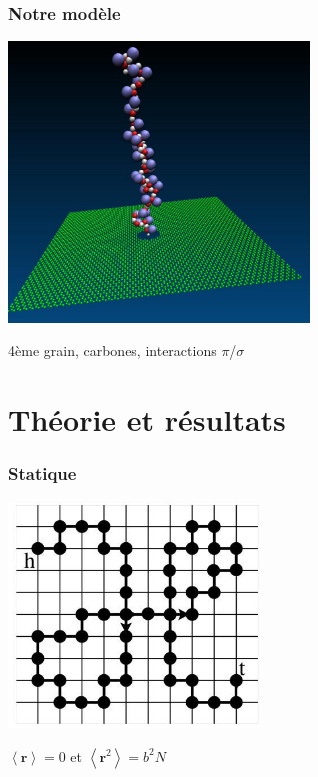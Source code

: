 \documentclass{beamer}
\begin{document}
\frame %
{
  \frametitle{Notre modèle}
 
\begin{center}

\includegraphics[width=0.6\textwidth]{systemmodlo.jpg}

4ème grain, carbones, interactions $\pi$/$\sigma$

\end{center}
}

\section{Théorie et résultats}

\frame %
{
  \frametitle{Statique}
 \centering
\includegraphics[width=0.5\textwidth]{resideal.jpg}
\medskip

$\left<\textbf{r}\right> =0$ et $\left<\textbf{r}^2\right> =b^2 N$

}
\end{document}
